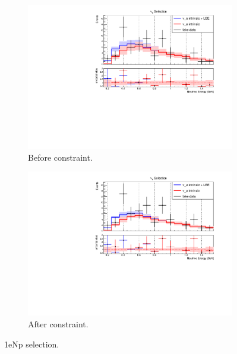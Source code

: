 \begin{figure}[H] 
\begin{center}
    \begin{subfigure}[b]{0.45\textwidth}
    \centering
    \includegraphics[width=1.00\textwidth]{Fakedata/set1/nue_numu_reco_e_H1_mc_fakedata_set1_nue_before_data_constraint.pdf}
    \caption{\label{fig:fakedata:set1:np_before_constrain} Before constraint.}
    \end{subfigure}
    \begin{subfigure}[b]{0.45\textwidth}
    \centering
    \includegraphics[width=1.00\textwidth]{Fakedata/set1/nue_numu_reco_e_H1_mc_fakedata_set1_univ_overlay_nue.pdf}
    \caption{\label{fig:fakedata:set1:np_after_constrain} After constraint.}
    \end{subfigure}
\caption{\label{fig:fakedata:set1:np_const} 1eNp selection.}
\end{center}
\end{figure}

